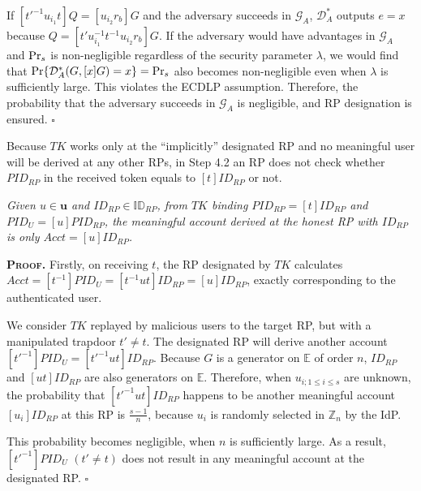 If $[t'^{-1}u_{i_1}t]Q = [u_{i_2}r_{b}]G$ and the adversary succeeds in $\mathcal{G}_A$, $\mathcal{D}^*_A$ outputs $e =x$
 because $Q = [t'u_{i_1}^{-1}t^{-1}u_{i_2}r_{b}]G$.
If the adversary would have advantages  in $\mathcal{G}_A$ and ${\rm Pr}_s$ is non-negligible regardless of the security parameter $\lambda$,
    we would find that ${\rm Pr}\{\mathcal{D}^*_A(G, [x]G)=x\}= {\rm Pr}_s$ also becomes non-negligible even when $\lambda$ is sufficiently large.
This violates the ECDLP assumption.
Therefore, the probability that the adversary succeeds in $\mathcal{G}_A$ is negligible,
    and RP designation is ensured.
\hfill $\square$
\vspace{1mm}

Because $TK$ works only at the ``implicitly'' designated RP and
    no meaningful user will be derived at any other RPs, %
 in Step 4.2 an RP does not check whether $PID_{RP}$ in the received token equals to $[t]ID_{RP}$ or not.


\vspace{-1mm}
\begin{thm} \emph{Given $u \in \mathbf{u}$ and $ID_{RP} \in \mathbb{ID}_{RP}$,
from $TK$ binding $PID_{RP}=[t]ID_{RP}$ and $PID_U = [u]PID_{RP}$,
 the meaningful account derived at the honest RP with $ID_{RP}$ 
 is only $Acct = [u]ID_{RP}$.}\label{thm-user-id}
\end{thm}
\vspace{-1mm}

\noindent\textbf{\textsc{Proof.}}
Firstly, on receiving $t$,
the RP designated by $TK$ calculates $Acct = [t^{-1}]PID_{U} =[t^{-1}ut]ID_{RP} = [u]ID_{RP}$,
    exactly corresponding to the authenticated user.

We consider $TK$ replayed by malicious users to the target RP, but with a manipulated trapdoor $t' \neq t$.
The designated RP will derive another account $[t'^{-1}]PID_U = [t'^{-1}ut]ID_{RP}$.
Because $G$ is a generator on $\mathbb{E}$ of order $n$, $ID_{RP}$ and $[ut]ID_{RP}$ are also generators on $\mathbb{E}$.
Therefore, when $u_{i; 1\leq i \leq s}$ are unknown, the probability that $[t'^{-1}ut]ID_{RP}$ happens to be another meaningful account $[u_i]ID_{RP}$ at this RP is $\frac{s-1}{n}$,
because $u_i$ is randomly selected in $\mathbb{Z}_n$ by the IdP.

This probability becomes negligible, when $n$ is sufficiently large.
As a result, $[t'^{-1}]PID_U$ $(t' \neq t)$ does not result in any meaningful account at the designated RP. 
\hfill $\square$

